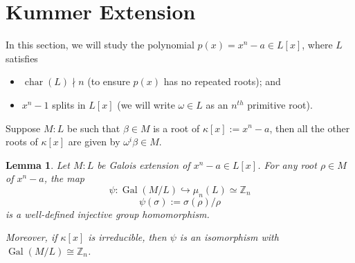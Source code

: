 \documentclass[11pt]{book}
\newtheorem{lemma}[theorem]{Lemma}
\begin{document}
\section{Kummer Extension}
In this section, we will study the polynomial $p(x)=x^n-a \in L[x]$, where $L$ satisfies 
\begin{itemize}
    \item $\operatorname{char}(L) \nmid n$ (to ensure $p(x)$ has no repeated roots); and
    \item $x^n-1$ splits in $L[x]$ (we will write $\omega \in L$ as an $n^{th}$ primitive root).
\end{itemize}
Suppose $M:L$ be such that $\beta \in M$ is a root of $\kappa[x] := x^n-a$, then all the other roots of $\kappa[x]$ are given by $\omega^i\beta \in M$.
\begin{lemma} \label{lem-kummer}
    Let $M:L$ be Galois extension of $x^n-a\in L[x]$. For any root $\rho \in M$ of $x^n-a$, the map 
    $$\psi: \operatorname{Gal}(M/L) \hookrightarrow \mu_n(L)\simeq \mathbb{Z}_n$$ 
$$\psi(\sigma):=\sigma(\rho)/\rho  $$  
is a well-defined injective group homomorphism.

Moreover, if $\kappa[x]$ is irreducible, then $\psi$ is an isomorphism with $\operatorname{Gal}(M/L) \cong \mathbb{Z}_n$.
\end{lemma}
\end{document}
